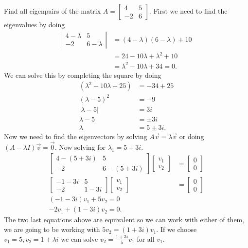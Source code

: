  \begin{eg}
  Find all eigenpairs of the matrix $A=\begin{bmatrix} 4&5\\-2&6 \end{bmatrix} $. First we need to find the eigenvalues by doing 
  \begin{align*}
    \left| \begin{matrix} 4-\lambda&5\\-2&6-\lambda \end{matrix} \right| &=(4-\lambda)(6-\lambda)+10\\
                                   &=24-10\lambda+\lambda^2+10\\
                                   &=\lambda^2-10\lambda+34=0
  .\end{align*}
  We can solve this by completing the square by doing 
  \begin{align*}
    (\lambda^2-10\lambda+25)&=-34+25\\
    (\lambda-5)^2&=-9\\
    |\lambda-5|&=3i\\
    \lambda-5&=\pm 3i\\
    \lambda &= 5\pm 3i
  .\end{align*}
  Now we need to find the eigenvectors by solving $A\vec{v}=\lambda\vec{v}$ or doing $(A-\lambda I)\vec{v}=\vec{0}$. Now solving for $\lambda_1=5+3i$.
  \begin{align*}
    \begin{bmatrix} 4-(5+3i)&5\\-2&6-(5+3i) \end{bmatrix} \begin{bmatrix} v_1\\v_2 \end{bmatrix} &=\begin{bmatrix} 0\\0 \end{bmatrix} \\
    \begin{bmatrix} -1-3i&5\\-2&1-3i \end{bmatrix} \begin{bmatrix} v_1\\v_2 \end{bmatrix} &=\begin{bmatrix} 0\\0 \end{bmatrix} \\
    (-1-3i)v_1+5v_2=0\\
    -2v_1+(1-3i)v_2=0
  .\end{align*}
  The two last equations above are equivalent so we can work with either of them, we are going to be working with $5v_2=(1+3i)v_1$. If we choose $v_1=5,v_2=1+\lambda i$ we can solve $v_2=\frac{1+3i}{5}v_1$ for all $v_1$.
\end{eg}
